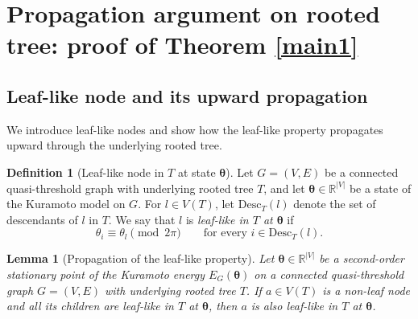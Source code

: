 \documentclass[11pt,reqno]{amsart}
\newtheorem{lemma}[theorem]{Lemma}
\theoremstyle{definition}
\newtheorem{definition}[theorem]{Definition}
\begin{document}
\section{Propagation argument on rooted tree:  proof of Theorem \ref{main1}}\label{sec:quasi-threshold}
\subsection{Leaf-like node and its upward propagation}
We introduce leaf-like nodes and show how the leaf-like property
propagates upward through the underlying rooted tree.
\begin{definition}[Leaf-like node in $T$ at state $\boldsymbol{\theta}$]
Let $G=(V,E)$ be a connected quasi-threshold graph with
underlying rooted tree $T$, and let
$\boldsymbol{\theta}\in\mathbb{R}^{|V|}$ be a state of the
Kuramoto model on $G$.
For $l\in V(T)$, let $\mathrm{Desc}_T(l)$ denote the set of
descendants of $l$ in $T$.
We say that $l$ is \emph{leaf-like in $T$ at
$\boldsymbol{\theta}$} if
\[
    \theta_i \equiv \theta_l \pmod{2\pi}
    \qquad \text{for every } i\in\mathrm{Desc}_T(l).
\]
\end{definition}

\begin{lemma}[Propagation of the leaf-like property]
\label{lemma:leaflike}
Let $\boldsymbol{\theta}\in\mathbb{R}^{|V|}$ be a second-order
stationary point of the Kuramoto energy $E_G(\boldsymbol{\theta})$ on a connected
quasi-threshold graph $G=(V,E)$ with underlying rooted tree $T$.
If $a\in V(T)$ is a non-leaf node and all its children are
leaf-like in $T$ at $\boldsymbol{\theta}$, then $a$ is also
leaf-like in $T$ at $\boldsymbol{\theta}$.
\end{lemma}
\end{document}
